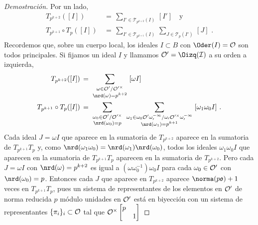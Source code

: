 \begin{proof}[Demostraci\'{o}n]
	Por un lado,
	\begin{align*}
		T_{p^{k+2}}([I]) & \,=\,
			\sum_{I'\in\mathscr{T}_{p^{k+2}}(I)}\,[I']
						\quad\text{y} \\
		T_{p^{k+1}}\circ T_{p}([I]) & \,=\,
			\sum_{I'\in\mathscr{T}_{p^{k+1}}(I)}\,
			\sum_{J\in\mathscr{T}_{p}(I')}\,[J]
		\text{ .}
	\end{align*}
	Recordemos que, sobre un cuerpo local, los ideales $I\subset B$ con
	$\Oder(I)=\cal{O}$ son todos principales. Si fijamos un ideal $I$ y
	llamamos $\cal{O}'=\Oizq(I)$ a su orden a izquierda,
	\begin{align*}
		T_{p^{k+2}}([I]) & \,=\,\sum_{
			\begin{smallmatrix}
				\omega\in\cal{O}'/\cal{O}'^{\times} \\
				\nrd(\omega)=p^{k+2}
			\end{smallmatrix}
			}\,[\omega I] \\
		T_{p^{k+1}}\circ T_{p}([I]) & \,=\,\sum_{
			\begin{smallmatrix}
				\omega_{0}\in\cal{O}'/\cal{O}'^{\times} \\
				\nrd(\omega_{0})=p
			\end{smallmatrix}
			}\,\sum_{
			\begin{smallmatrix}
				\omega_{1}\in\omega_{0}\cal{O}'
				\omega_{0}^{-1}/\omega_{0}
				\cal{O}'^{\times}\omega_{0}^{-1} \\
				\nrd(\omega_{1})=p^{k+1}
			\end{smallmatrix}
			}\,[\omega_{1}\omega_{0}I]
		\text{ .}
	\end{align*}
	Cada ideal $J=\omega I$ que aparece en la sumatoria de $T_{p^{k+2}}$
	aparece en la sumatoria de $T_{p^{k+1}}T_{p}$ y, como
	$\nrd(\omega_{1}\omega_{0})=\nrd(\omega_{1})\nrd(\omega_{0})$,
	todos los ideales $\omega_{1}\omega_{0}I$ que aparecen en la sumatoria
	de $T_{p^{k+1}}T_{p}$ aparecen en la sumatoria de $T_{p^{k+2}}$. Pero
	cada $J=\omega I$ con $\nrd(\omega)=p^{k+2}$ es igual a
	$(\omega\omega_{0}^{-1})\omega_{0} I$ para cada $\omega_{0}\in\cal{O}'$
	con $\nrd(\omega_{0})=p$. Entonces cada $J$ que aparece en
	$T_{p^{k+2}}$ aparece $\norma(p\frak{o})+1$ veces en
	$T_{p^{k+1}}T_{p}$, pues un sistema de representantes de los elementos
	en $\cal{O}'$ de norma reducida $p$ m\'{o}dulo unidades en $\cal{O}'$
	est\'{a} en biyecci\'{o}n con un sistema de representantes
	$\{\pi_{i}\}_{i}\subset\cal{O}$ tal que
	\begin{math}
		\cal{O}^{\times}\begin{bmatrix} p & \\ & 1 \end{bmatrix}

\end{math}
\end{proof}
